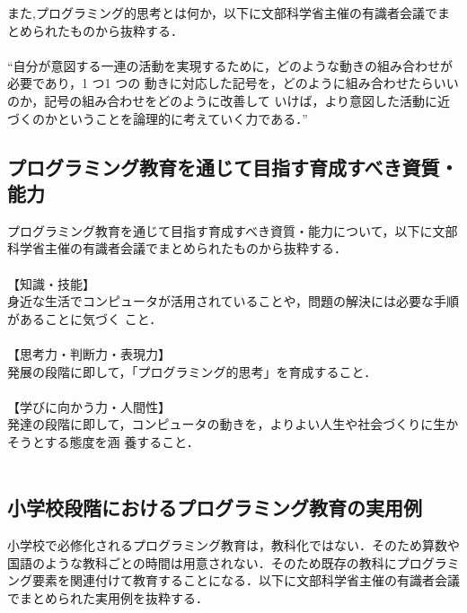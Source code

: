 また,プログラミング的思考とは何か，以下に文部科学省主催の有識者会議でまとめられたものから抜粋する．
\\
\\
``自分が意図する一連の活動を実現するために，どのような動きの組み合わせが必要であり，1 つ1 つの
動きに対応した記号を，どのように組み合わせたらいいのか，記号の組み合わせをどのように改善して
いけば，より意図した活動に近づくのかということを論理的に考えていく力である．''


\subsection{プログラミング教育を通じて目指す育成すべき資質・能力}
プログラミング教育を通じて目指す育成すべき資質・能力について，以下に文部科学省主催の有識者会議でまとめられたものから抜粋する．\\
\\
【知識・技能】\\
身近な生活でコンピュータが活用されていることや，問題の解決には必要な手順があることに気づく
こと．\\
\\
【思考力・判断力・表現力】\\
発展の段階に即して，「プログラミング的思考」を育成すること．\\
\\
【学びに向かう力・人間性】\\
発達の段階に即して，コンピュータの動きを，よりよい人生や社会づくりに生かそうとする態度を涵
養すること．\\
\\

\subsection{小学校段階におけるプログラミング教育の実用例}
小学校で必修化されるプログラミング教育は，教科化ではない．そのため算数や国語のような教科ごとの時間は用意されない．そのため既存の教科にプログラミング要素を関連付けて教育することになる．以下に文部科学省主催の有識者会議でまとめられた実用例を抜粋する．\\\\

